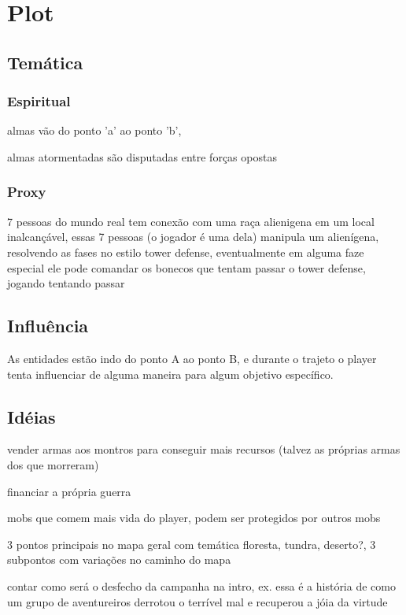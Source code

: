 \documentclass[12pt,a4paper]{article}
\begin{document}
\pagecolor{yellow!30}


\section{Plot}

\subsection{Temática}

\subsubsection{Espiritual}

\par
almas vão do ponto 'a' ao ponto 'b',
\par
almas atormentadas são disputadas entre forças opostas

\subsubsection{Proxy}

\par 7 pessoas do mundo real tem conexão com uma raça alienigena em um local inalcançável, essas 7 pessoas (o jogador é uma dela) manipula um alienígena, resolvendo as fases no estilo tower defense, eventualmente em alguma faze especial ele pode comandar os bonecos que tentam passar o tower defense, jogando tentando passar

\subsection{Influência}

As entidades estão indo do ponto A ao ponto B, e durante o trajeto o player tenta influenciar de alguma maneira para algum objetivo específico.

\subsection{Idéias}

\par
vender armas aos montros para conseguir mais recursos (talvez as próprias armas dos que morreram)

\par
financiar a própria guerra

\par
mobs que comem mais vida do player, podem ser protegidos por outros mobs

\par
3 pontos principais no mapa geral com temática floresta, tundra, deserto?, 3 subpontos com variações no caminho do mapa

\par
contar como será o desfecho da campanha na intro, ex. essa é a história de como um grupo de aventureiros derrotou o terrível mal e recuperou a jóia da virtude
\end{document}
